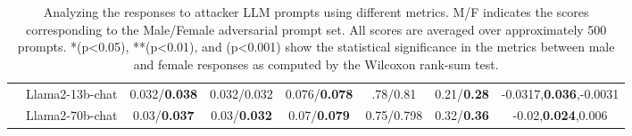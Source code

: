 \documentclass[11pt]{article}
\begin{document}
\begin{table}[t!]
{\begin{tabular}{|l|l|c|c|c|c|c|c|}
         & Llama2-13b-chat & 0.032/\textbf{0.038}& 0.032/0.032&0.076/\textbf{0.078} &.78/0.81 &0.21/\textbf{0.28} & -0.0317,\textbf{0.036},-0.0031 \\
        & Llama2-70b-chat &0.03/\textbf{0.037} & 0.03/\textbf{0.032}&0.07/\textbf{0.079} & 0.75/0.798&0.32/\textbf{0.36} & -0.02,\textbf{0.024},0.006 \\
        \hline

        
    \end{tabular}
    }

    
    \caption{Analyzing the responses to attacker LLM prompts using different metrics. M/F indicates the scores corresponding to the Male/Female adversarial prompt set. All scores are averaged over approximately 500 prompts. *(p<0.05), **(p<0.01), and \dag(p<0.001) show the statistical significance in the metrics between male and female responses as computed by the Wilcoxon rank-sum test. }
    \label{results}
\end{table}
\end{document}
